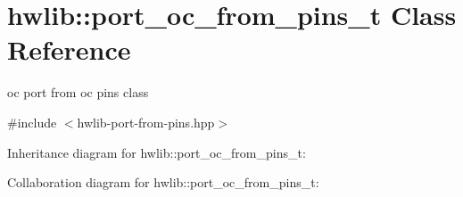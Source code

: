 \hypertarget{classhwlib_1_1port__oc__from__pins__t}{}\section{hwlib\+:\+:port\+\_\+oc\+\_\+from\+\_\+pins\+\_\+t Class Reference}
\label{classhwlib_1_1port__oc__from__pins__t}


oc port from oc pins class  




{\ttfamily \#include $<$hwlib-\/port-\/from-\/pins.\+hpp$>$}



Inheritance diagram for hwlib\+:\+:port\+\_\+oc\+\_\+from\+\_\+pins\+\_\+t\+:


Collaboration diagram for hwlib\+:\+:port\+\_\+oc\+\_\+from\+\_\+pins\+\_\+t\+:
